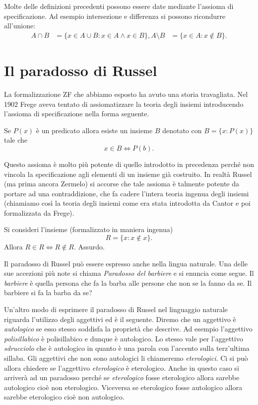 \documentclass[italian,a4paper,hidelinks,headinclude]{scrartcl}
\begin{document}
Molte delle definizioni precedenti possono essere date mediante l'assioma
di specificazione. Ad esempio intersezione e differenza si possono
ricondurre all'unione:
\begin{align*}
  A \cap B &= \{x\in A \cup B \colon x\in A \land x \in B\},
  A \setminus B &= \{x\in A \colon x \not \in B\}.
\end{align*}


\section{Il paradosso di Russel}

La formalizzazione ZF che abbiamo esposto ha avuto una storia travagliata.
Nel 1902 Frege aveva tentato di assiomatizzare la teoria degli
insiemi introducendo l'assioma di specificazione nella forma seguente.

\begin{axiom}
  Se $P(x)$ è un predicato allora esiste un insieme
  $B$ denotato con $B=\{x\colon P(x)\}$ tale che
  \[
    x\in B \iff P(b).
  \]
\end{axiom}

Questo assioma è molto più potente di quello introdotto in precedenza perché
non vincola la specificazione agli elementi di un insieme già costruito.
In realtà Russel (ma prima ancora Zermelo) si accorse che tale assioma è talmente
potente da portare ad una contraddizione, che fa cadere
l'intera teoria ingenua degli insiemi (chiamiamo così la teoria degli insiemi
come era stata introdotta da Cantor e poi formalizzata da Frege).

\begin{paradox}[Russel]
Si consideri l'insieme (formalizzato in maniera ingenua)
\[
  R = \{ x\colon x \not\in x\}.
\]
Allora $R\in R \iff R\not \in R$. Assurdo.
\end{paradox}

Il paradosso di Russel può essere espresso anche nella lingua naturale.
Una delle sue accezioni più note si chiama \emph{Paradosso del barbiere}
e si enuncia come segue. Il \emph{barbiere} è quella persona che fa la barba
alle persone che non se la fanno da se. Il barbiere si fa la barba da se?

Un'altro modo di esprimere il paradosso di Russel nel linguaggio naturale
riguarda l'utilizzo degli aggettivi ed è il seguente. Diremo che un aggettivo
è \emph{autologico} se esso stesso soddisfa la proprietà che descrive.
Ad esempio l'aggettivo \emph{polisillabico} è polisillabico e dunque è
autologico. Lo stesso vale per l'aggettivo \emph{sdrucciolo}
che è autologico in quanto è una parola con l'accento sulla terz'ultima sillaba.
Gli aggettivi che non sono autologici li chiameremo \emph{eterologici}.
Ci si può allora chiedere se l'aggettivo \emph{eterologico} è eterologico.
Anche in questo caso si arriverà ad un paradosso perché se \emph{eterologico}
fosse eterologico allora sarebbe autologico cioè non eterologico.
Viceversa se eterologico fosse autologico allora sarebbe eterologico cioè
non autologico.
\end{document}
